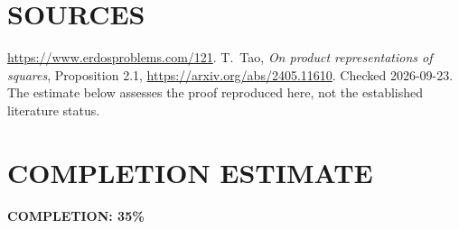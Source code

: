 \section{SOURCES}
\url{https://www.erdosproblems.com/121}.
T.~Tao, \emph{On product representations of squares}, Proposition 2.1,
\url{https://arxiv.org/abs/2405.11610}.
Checked 2026-09-23. The estimate below assesses the proof reproduced
here, not the established literature status.

\section{COMPLETION ESTIMATE}
\textbf{COMPLETION: 35\%}
